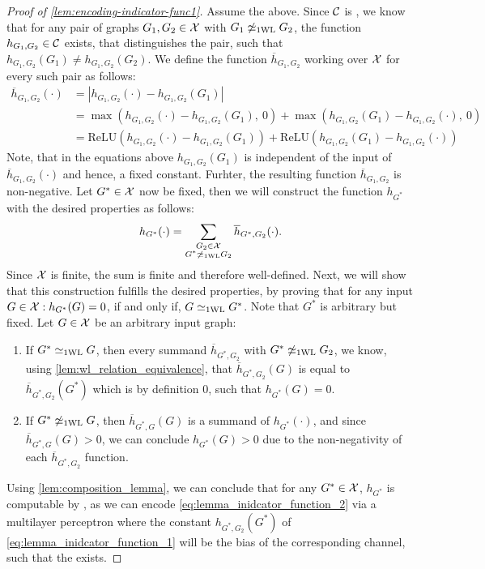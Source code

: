 \begin{proof}[Proof of \cref{lem:encoding-indicator-func1}]
    Assume the above. Since $\mathcal{C}$ is \wldisc, we know that for any pair of graphs $G_1, G_2 \in \mathcal{X}$ with $G_1 \not\simeq_{\text{1WL}} G_2$, the function $h_{G_1, G_2} \in \mathcal{C}$ exists, that distinguishes the pair, such that $h_{G_1, G_2}(G_1) \neq h_{G_1, G_2}(G_2)$. We define the function $\overline{h}_{G_1,G_2}$ working over $\mathcal{X}$ for every such pair as follows:
    \begin{align}\label{eq:lemma_inidcator_function_1}
        \overline{h}_{G_1, G_2}(\cdot) &= |h_{G_1, G_2}(\cdot) - h_{G_1, G_2}(G_1)| \nonumber\\
        &= \max(h_{G_1, G_2}(\cdot) - h_{G_1, G_2}(G_1), \ 0) + \max(h_{G_1, G_2}(G_1) - h_{G_1, G_2}(\cdot), \ 0) \nonumber\\
        &= \text{ReLU}(h_{G_1, G_2}(\cdot) - h_{G_1, G_2}(G_1)) + \text{ReLU}(h_{G_1, G_2}(G_1) - h_{G_1, G_2}(\cdot))
    \end{align}
    Note, that in the equations above $h_{G_1, G_2}(G_1)$ is independent of the input of $\overline{h}_{G_1, G_2}(\cdot)$ and hence, a fixed constant. Furhter, the resulting function $\overline{h}_{G_1, G_2}$ is non-negative.
    Let $G^* \in \mathcal{X}$ now be fixed, then we will construct the function $h_{G^*}$ with the desired properties as follows:
    \begin{align}\label{eq:lemma_inidcator_function_2}
        h_{G^*}(\cdot) = \sum_{\substack{G_2 \in \mathcal{X} \\ G^* \not\simeq_{\text{1WL}} G_2}} \overline{h}_{G^*, G_2}(\cdot).
    \end{align}
    Since $\mathcal{X}$ is finite, the sum is finite and therefore well-defined. Next, we will show that this construction fulfills the desired properties, by proving that for any input $G \in \mathcal{X}: h_{G^*}(G) = 0$, if and only if, $G \simeq_{\text{1WL}} G^*$. Note that $G^*$ is arbitrary but fixed. Let $G \in \mathcal{X}$ be an arbitrary input graph:
    \begin{enumerate}
        \item If $G^* \simeq_{\text{1WL}} G$, then every summand $\overline{h}_{G^*, G_2}$ with $G^* \not\simeq_{\text{1WL}} G_2$, we know, using \cref{lem:wl_relation_equivalence}, that $\overline{h}_{G^*, G_2}(G)$ is equal to $\overline{h}_{G^*, G_2}(G^*)$ which is by definition $0$, such that $h_{G^*}(G) = 0$.
        \item If $G^* \not\simeq_{\text{1WL}} G$, then $\overline{h}_{G^*, G}(G)$ is a summand of $h_{G^*}(\cdot)$, and since $\overline{h}_{G^*, G}(G) > 0$, 
        we can conclude $h_{G^*}(G) > 0$ due to the non-negativity of each $\overline{h}_{G^*, G_2}$ function.
    \end{enumerate}
    Using \cref{lem:composition_lemma}, we can conclude that for any $G^* \in \mathcal{X}$, $h_{G^*}$ is computable by \wlnn, as we can encode \cref{eq:lemma_inidcator_function_2} via a multilayer perceptron \mlp where the constant $h_{G^*, G_2}(G^*)$ of \cref{eq:lemma_inidcator_function_1} will be the bias of the corresponding channel, such that the \mlp exists.


\end{proof}
